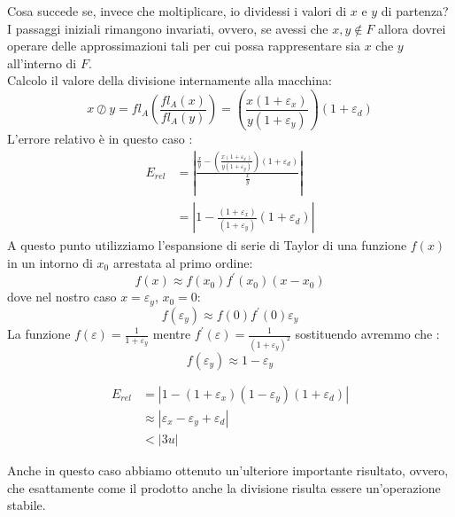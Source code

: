 \documentclass[12pt, a4paper]{book}
\theoremstyle{definition}
\begin{document}
\begin{flushleft}
Cosa succede se, invece che moltiplicare, io dividessi i valori di $x$ e $y$ di partenza?\\
I passaggi iniziali rimangono invariati, ovvero, se avessi che $x,y \notin F$ allora dovrei operare delle approssimazioni tali per cui possa rappresentare sia $x$ che $y$ all'interno di $F$. \\
Calcolo il valore della divisione internamente alla macchina: 
\[ x \oslash y =  fl_{A}\left( \frac{fl_{A}(x)}{fl_{A}(y)}\right) = \left(\frac{x(1+\varepsilon_{x})}{y(1+\varepsilon_{y})} \right)(1+\varepsilon_{d})\]
L'errore relativo è in questo caso : 
\begin{equation} \label{}
	\begin{split}
		E_{rel} &=  \displaystyle\left\lvert \frac{ \frac{x}{y} -  \left(\frac{x(1+\varepsilon_{x})}{y(1+\varepsilon_{y})} \right)(1+\varepsilon_{d})}{ \frac{x}{y}} \right\rvert  \\
				   &=  \displaystyle\left\lvert 1 - \frac{(1+\varepsilon_{x})}{(1+\varepsilon_{y})}(1+\varepsilon_{d}) \right\rvert
	\end{split}
\end{equation}
A questo punto utilizziamo l'espansione di serie di Taylor di una funzione $f(x)$ in un intorno di $x_{0}$ arrestata al primo ordine: 
\[ f(x) \approx f(x_{0})f^{'}(x_{0})(x-x_{0})  \]
dove nel nostro caso $x = \varepsilon_{y}$, $x_{0} = 0$:
\[ f(\varepsilon_{y}) \approx f(0)f^{'}(0)\varepsilon_{y}  \]
La funzione $f(\varepsilon) = \frac{1}{1+\varepsilon_{y}} $ mentre $f^{'}(\varepsilon) = \frac{1}{(1+\varepsilon_{y})^{2}} $ sostituendo avremmo che : 
\[ f(\varepsilon_{y}) \approx 1-\varepsilon_{y} \]

\begin{equation} \label{}
	\begin{split}
		E_{rel}  &=  \displaystyle\left\lvert 1 - (1+\varepsilon_{x})(1-\varepsilon_{y})(1+\varepsilon_{d}) \right\rvert \\
					&\approx  \displaystyle\left\lvert \varepsilon_{x} -  \varepsilon_{y} +  \varepsilon_{d} \right\rvert \\
					& < |3u|
	\end{split}
\end{equation}

Anche in questo caso abbiamo ottenuto un'ulteriore importante risultato, ovvero, che esattamente come il prodotto anche la divisione risulta essere un'operazione stabile.

\end{flushleft}
\end{document}
